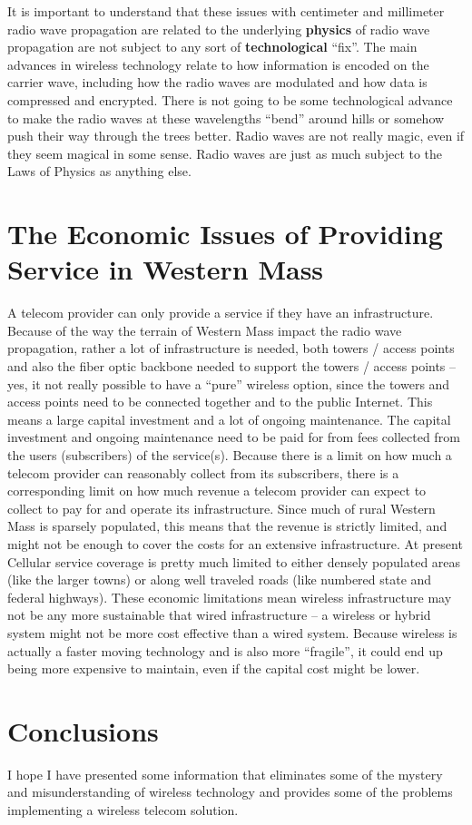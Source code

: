 \documentclass[12pt]{article}
\begin{document}
It is important to understand that these issues with centimeter and millimeter 
radio wave propagation are related to the underlying \textbf{physics} of radio 
wave propagation are not subject to any sort of \textbf{technological} 
``fix''.  The main advances in wireless technology relate to how information 
is encoded on the carrier wave, including how the radio waves are modulated 
and how data is compressed and encrypted.  There is not going to be some 
technological advance to make the radio waves at these wavelengths ``bend'' 
around hills or somehow push their way through the trees better.  Radio waves 
are not really magic, even if they seem magical in some sense.  Radio waves 
are just as much subject to the Laws of Physics as anything else.

\section{The Economic Issues of Providing Service in Western Mass}

A telecom provider can only provide a service if they have an infrastructure.
Because of the way the terrain of Western Mass impact the radio wave
propagation, rather a lot of infrastructure is needed, both towers / access
points and also the fiber optic backbone needed to support the towers / access
points -- yes, it not really possible to have a ``pure'' wireless option,
since the towers and access points need to be connected together and to the
public Internet. This means a large capital investment and a lot of ongoing
maintenance. The capital investment and ongoing maintenance need to be paid
for from fees collected from the users (subscribers) of the service(s).
Because there is a limit on how much a telecom provider can reasonably collect
from its subscribers, there is a corresponding limit on how much revenue a
telecom provider can expect to collect to pay for and operate its
infrastructure. Since much of rural Western Mass is sparsely populated, this
means that the revenue is strictly limited, and might not be enough to cover
the costs for an extensive infrastructure. At present Cellular service
coverage is pretty much limited to either densely populated areas (like the
larger towns) or along well traveled roads (like numbered state and federal
highways).  These economic limitations mean wireless infrastructure may not be 
any more sustainable that wired infrastructure -- a wireless or hybrid system 
might not be more cost effective than a wired system.  Because wireless is 
actually a faster moving technology and is also more ``fragile'', it could end 
up being more expensive to maintain, even if the capital cost might be lower. 

\section{Conclusions}

I hope I have presented some information that eliminates some of the mystery 
and misunderstanding of wireless technology and provides some of the problems 
implementing a wireless telecom solution.


\appendix
\cleardoublepage
{}


\end{document}
